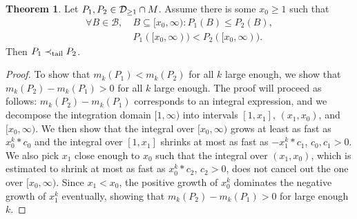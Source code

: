 \documentclass[a4paper]{scrreprt}
\newcommand{\B}{\mathcal{B}}
\newcommand{\M}{M}
\theoremstyle{definition}
\newtheorem{thm}{Theorem}[chapter] %
\begin{document}
    \begin{thm}
        Let $P_1, P_2 \in \Dgeqone \cap \M$. Assume there is some $x_0 \geq 1$ such that
        \begin{align}
            \forall B \in \B, &~B \subseteq [x_0, \infty): P_1(B) \leq P_2(B)  \label{eq:p2DominatesP1LeftOfX0},  \\
            &~P_1([x_0, \infty)) < P_2([x_0, \infty)) \label{eq:p2StrictlyDominatesP1OnB0}.
        \end{align}
        Then $P_1 \prec_{\text{tail}} P_2$.
        \label{thm:tailOrderSufficientConditionsGeneral}
    \end{thm}    
    \begin{proof}
        To show that $m_k(P_1) < m_k(P_2)$ for all $k$ large enough, we show that $m_k(P_2) - m_k(P_1) > 0$ for all $k$ large enough.
        The proof will proceed as follows: $m_k(P_2) - m_k(P_1)$ corresponds to an integral expression, and we decompose the integration domain $[1, \infty)$ into intervals $[1, x_1]$, $(x_1, x_0)$, and $[x_0, \infty)$. We then show that the integral over $[x_0, \infty)$ grows at least as fast as $x_0^k*c_0$ and the integral over $[1, x_1]$ shrinks at most as fast as $-x_1^k*c_1$, $c_0, c_1 > 0$. We also pick $x_1$ close enough to $x_0$ such that the integral over $(x_1, x_0)$, which is estimated to shrink at most as fast as $x_0^k * c_2$, $c_2 > 0$, does not cancel out the one over $[x_0, \infty)$. Since $x_1 < x_0$, the positive growth of $x_0^k$ dominates the negative growth of $x_1^k$ eventually, showing that $m_k(P_2) - m_k(P_1) > 0$ for large enough $k$.
        

\end{proof}
\end{document}
